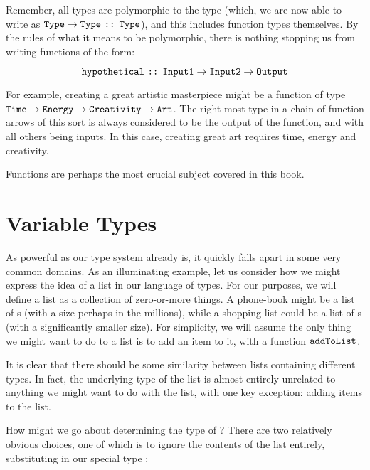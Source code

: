 Remember, all types are polymorphic to the type  (which, we are now able to write as $\text{\texttt{Type}} \to
\text{\texttt{Type}} \text{ \texttt{::} } \text{\texttt{Type}}$), and this includes function types themselves. By the rules of what it means to be
polymorphic, there is nothing stopping us from writing functions of the form:

$$ \text{\texttt{hypothetical}} \text{ \texttt{::} } \text{\texttt{Input1}} \to \text{\texttt{Input2}} \to \text{\texttt{Output}}$$

For example, creating a great artistic masterpiece might be a function of type $\text{\texttt{Time}} \to \text{\texttt{Energy}} \to
\text{\texttt{Creativity}} \to \text{\texttt{Art}}$. The right-most type in a chain of function arrows of this sort is always considered
to be the output of the function, and with all others being inputs. In this case, creating great art requires time,
energy and creativity.

Functions are perhaps the most crucial subject covered in this
book.


\section{Variable Types}
As powerful as our type system already is, it quickly falls apart in some very common domains. As an illuminating
example, let us consider how we might express the idea of a list in our language of types. For our purposes, we will
define a list as a collection of zero-or-more things. A phone-book might be a list of s (with a size perhaps
in the millions), while a shopping list could be a list of s (with a significantly smaller size). For
simplicity, we will assume the only thing we might want to do to a list is to add an item to it, with a function
$\text{\texttt{addToList}}$.

It is clear that there should be some similarity between lists containing different types. In fact, the underlying type
of the list is almost entirely unrelated to anything we might want to do with the list, with one key exception: adding
items to the list.

How might we go about determining the type of ? There are two relatively obvious choices, one of which
is to ignore the contents of the list entirely, substituting in our special type :

